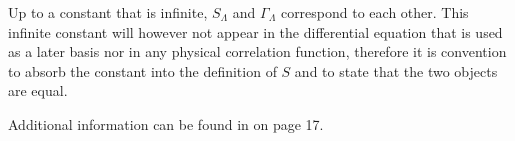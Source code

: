 Up to a constant that is infinite, \( S_\Lambda \) and \( \Gamma_\Lambda \) correspond to each other. This infinite constant will however not appear in the differential equation that is used as a later basis nor in any physical correlation function, therefore it is convention to absorb the constant into the definition of \( S \) and to state that the two objects are equal.

Additional information can be found in \cite{btw} on page 17.



